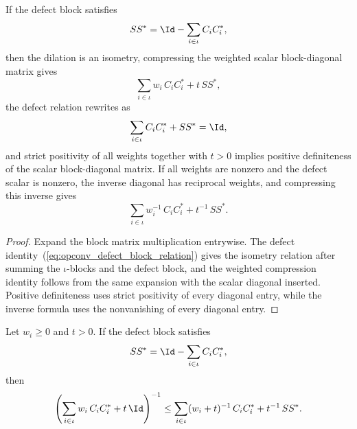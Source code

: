 \begin{lemma}\label{lem:operator_jensen_povm_compression}
    \leanok
    If the defect block satisfies
    \begin{equation}\label{eq:opconv_defect_block_relation}
        S S^\ast = \Id - \sum_{i \in \iota} C_i C_i^\ast,
    \end{equation}
    then the dilation is an isometry, compressing the weighted scalar
    block-diagonal matrix gives
    \[
        \sum_{i \in \iota} w_i\, C_i C_i^\ast + t\, S S^\ast,
    \]
    the defect relation rewrites as
    \[
        \sum_{i \in \iota} C_i C_i^\ast + S S^\ast = \Id,
    \]
    and strict positivity of all weights together with $t>0$ implies positive
    definiteness of the scalar block-diagonal matrix. If all weights are nonzero
    and the defect scalar is nonzero, the inverse diagonal has reciprocal
    weights, and compressing this inverse gives
    \[
        \sum_{i \in \iota} w_i^{-1}\, C_i C_i^\ast + t^{-1}\, S S^\ast.
    \]
\end{lemma}

\begin{proof}
    \leanok
    Expand the block matrix multiplication entrywise. The defect
    identity~(\ref{eq:opconv_defect_block_relation}) gives
    the isometry relation after summing the $\iota$-blocks and the defect block,
    and the weighted compression identity follows from the same expansion with
    the scalar diagonal inserted. Positive definiteness uses strict positivity
    of every diagonal entry, while the inverse formula uses the nonvanishing of
    every diagonal entry.
\end{proof}

\begin{lemma}\label{lem:operator_jensen_povm_resolvent}
    \leanok
    Let $w_i\ge 0$ and $t>0$. If the defect block satisfies
    \[
        S S^\ast = \Id - \sum_{i \in \iota} C_i C_i^\ast,
    \]
    then
    \begin{equation}\label{eq:opconv_povm_resolvent_bound}
        \left(\sum_{i \in \iota} w_i\, C_i C_i^\ast + t\,\Id\right)^{-1}
        \le
        \sum_{i \in \iota} (w_i+t)^{-1}\, C_i C_i^\ast + t^{-1}\, S S^\ast.
    \end{equation}
\end{lemma}

